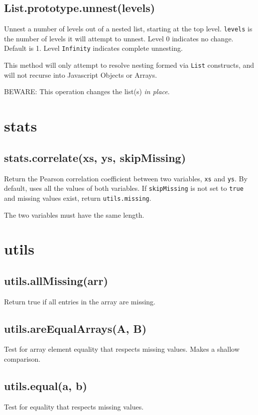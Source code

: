 \documentclass{article}
\begin{document}
    \subsection{List.prototype.unnest(levels)}
    Unnest a number of levels out of a nested list, starting at the
top level. \texttt{levels} is the number of levels it will attempt to unnest.
Level 0 indicates no change. Default is 1.
Level \texttt{Infinity} indicates complete unnesting.


This method will only attempt to resolve nesting formed via \texttt{List} constructs,
and will not recurse into Javascript Objects or Arrays.


BEWARE: This operation changes the list(s) \emph{in place}.


  \section{stats}
    \subsection{stats.correlate(xs, ys, skipMissing)}
    Return the Pearson correlation coefficient between two variables, \texttt{xs} and \texttt{ys}.
By default, uses all the values of both variables.  If \texttt{skipMissing} is not set
to \texttt{true} and missing values exist, return \texttt{utils.missing}.


The two variables must have the same length.


  \section{utils}
    \subsection{utils.allMissing(arr)}
    Return true if all entries in the array are missing.


    \subsection{utils.areEqualArrays(A, B)}
    Test for array element equality that respects missing values.
Makes a shallow comparison.


    \subsection{utils.equal(a, b)}
    Test for equality that respects missing values.
\end{document}
